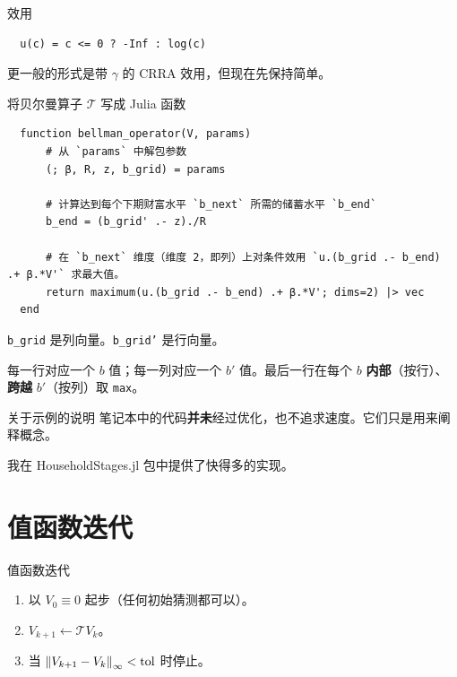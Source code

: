 \documentclass[10pt,aspectratio=169]{beamer}
\begin{document}
\begin{frame}[fragile]{效用}
  \begin{lstlisting}
  u(c) = c <= 0 ? -Inf : log(c)
  \end{lstlisting}
  更一般的形式是带 $\gamma$ 的 CRRA 效用，但现在先保持简单。
\end{frame}

\begin{frame}[fragile]{将贝尔曼算子 $\mathcal{T}$ 写成 Julia 函数}
  \begin{lstlisting}
  function bellman_operator(V, params)
      # 从 `params` 中解包参数
      (; β, R, z, b_grid) = params

      # 计算达到每个下期财富水平 `b_next` 所需的储蓄水平 `b_end`
      b_end = (b_grid' .- z)./R

      # 在 `b_next` 维度（维度 2，即列）上对条件效用 `u.(b_grid .- b_end) .+ β.*V'` 求最大值。
      return maximum(u.(b_grid .- b_end) .+ β.*V'; dims=2) |> vec
  end
  \end{lstlisting}
  \texttt{b\_grid} 是列向量。\texttt{b\_grid'} 是行向量。

  每一行对应一个 $b$ 值；每一列对应一个 $b'$ 值。最后一行在每个 $b$ \textbf{内部}（按行）、\textbf{跨越} $b'$（按列）取 \texttt{max}。
\end{frame}

\begin{frame}{关于示例的说明}
  笔记本中的代码\textbf{并未}经过优化，也不追求速度。它们只是用来阐释概念。

  我在 HouseholdStages.jl 包中提供了快得多的实现。
\end{frame}

\section{值函数迭代}

\begin{frame}{值函数迭代}
  \begin{enumerate}
    \item 以 $V_0 \equiv 0$ 起步（任何初始猜测都可以）。
    \vspace{0.4em}
    \item $V_{k+1} \leftarrow \mathcal{T} V_k$。
    \vspace{0.4em}
    \item 当 $\left\| V_{k+1} - V_k \right\|_\infty < \text{tol}$ 时停止。
  \end{enumerate}
\end{frame}
\end{document}
